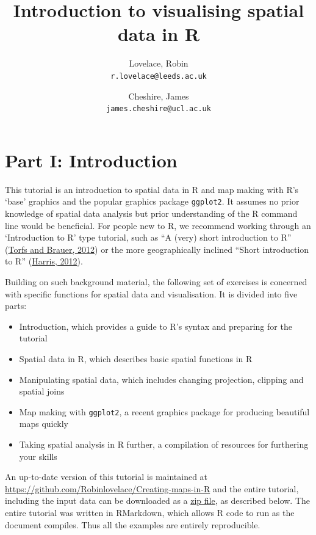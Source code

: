 \documentclass[]{article}
\author{Lovelace, Robin\\
\texttt{r.lovelace@leeds.ac.uk}
\and
Cheshire, James\\
\texttt{james.cheshire@ucl.ac.uk}
}
\title{Introduction to visualising spatial data in R}
\author{}
\date{}
\begin{document}
\section{Part I: Introduction}\label{part-i-introduction}

This tutorial is an introduction to spatial data in R and map making
with R's `base' graphics and the popular graphics package
\texttt{ggplot2}. It assumes no prior knowledge of spatial data analysis
but prior understanding of the R command line would be beneficial. For
people new to R, we recommend working through an `Introduction to R'
type tutorial, such as ``A (very) short introduction to R''
(\href{http://cran.r-project.org/doc/contrib/Torfs+Brauer-Short-R-Intro.pdf}{Torfs
and Brauer, 2012}) or the more geographically inclined ``Short
introduction to R''
(\href{http://www.social-statistics.org/wp-content/uploads/2012/12/intro_to_R1.pdf}{Harris,
2012}).

Building on such background material, the following set of exercises is
concerned with specific functions for spatial data and visualisation. It
is divided into five parts:

\begin{itemize}
\itemsep1pt\parskip0pt
\item
  Introduction, which provides a guide to R's syntax and preparing for
  the tutorial
\item
  Spatial data in R, which describes basic spatial functions in R
\item
  Manipulating spatial data, which includes changing projection,
  clipping and spatial joins
\item
  Map making with \texttt{ggplot2}, a recent graphics package for
  producing beautiful maps quickly
\item
  Taking spatial analysis in R further, a compilation of resources for
  furthering your skills
\end{itemize}

An up-to-date version of this tutorial is maintained at
\href{https://github.com/Robinlovelace/Creating-maps-in-R/blob/master/intro-spatial-rl.pdf}{https://github.com/Robinlovelace/Creating-maps-in-R}
and the entire tutorial, including the input data can be downloaded as a
\href{https://github.com/Robinlovelace/Creating-maps-in-R/archive/master.zip}{zip
file}, as described below. The entire tutorial was written in RMarkdown,
which allows R code to run as the document compiles. Thus all the
examples are entirely reproducible.
\end{document}
